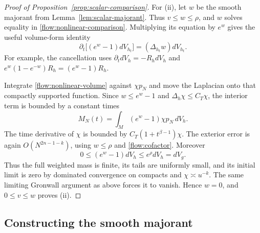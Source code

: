 \documentclass[11pt]{article}
\theoremstyle{definition}
\theoremstyle{remark}
\numberwithin{equation}{section}
\begin{document}
\begin{proof}[Proof of Proposition~\ref{prop:scalar-comparison}]
For \textup{(ii)}, let $w$ be the smooth majorant from
Lemma~\ref{lem:scalar-majorant}.  Thus $v\le w\le\rho$, and $w$
solves equality in \eqref{flow:nonlinear-comparison}.
Multiplying its equation by $e^w$ gives the useful
volume-form identity
\begin{equation}\label{flow:nonlinear-volume}
 \partial_t\bigl[(e^w-1)dV_{h_t}\bigr]
                    =(\Delta_{h_t}w)dV_{h_t}.
\end{equation}
For example, the cancellation uses
$\partial_tdV_h=-R_hdV_h$ and
$e^w(1-e^{-w})R_h=(e^w-1)R_h$.

Integrate \eqref{flow:nonlinear-volume} against $\chi p_N$ and
move the Laplacian onto that compactly supported function.  Since
$w\le e^w-1$ and $\Delta_h\chi\le C_T\chi$, the interior term is
bounded by a constant times
\[
 M_N(t)=\int_M(e^w-1)\chi p_N\,dV_h.
\]
The time derivative of $\chi$ is bounded by
$C_T(1+t^{\beta-1})\chi$.  The exterior error is again
$O(N^{2n-1-k})$, using $w\le\rho$ and
\eqref{flow:cofactor}.  Moreover
\[
 0\le(e^w-1)dV_h\le e^\rho dV_h=dV_g.
\]
Thus the full weighted mass is finite, its tails are uniformly
small, and its initial limit is zero by dominated convergence on
compacts and $\chi\asymp u^{-k}$.  The same limiting Gronwall
argument as above forces it to vanish.  Hence $w=0$, and $0\le v\le w$
proves \textup{(ii)}.
\end{proof}

\subsection{Constructing the smooth majorant}
\end{document}
